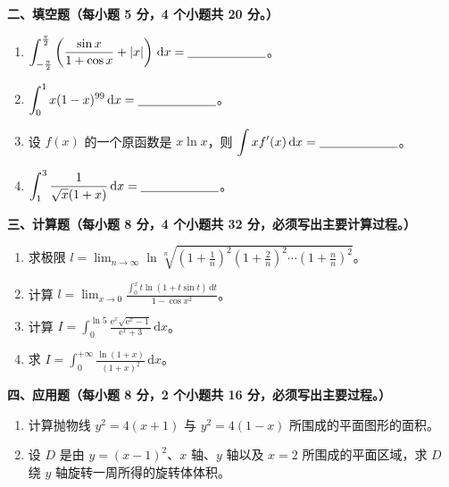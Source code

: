 \documentclass[a4paper,11pt]{ctexart}
\newcommand{\dd}{\,\mathrm{d}}
\newcommand{\e}{\mathrm{e}}
\newcommand{\blank}[1][2.2cm]{\underline{\hspace{#1}}}
\begin{document}
\vspace{0.5em}

\textbf{二、填空题（每小题 5 分，4 个小题共 20 分。）}

\begin{enumerate}[label=\arabic*., start=5, leftmargin=2em, itemsep=0.45em, topsep=0.35em]
  \item $\displaystyle\int_{-\frac{\pi}{2}}^{\frac{\pi}{2}}\left(\frac{\sin x}{1+\cos x}+|x|\right)\dd x=\blank$。

  \item $\displaystyle\int_0^1 x(1-x)^{99}\dd x=\blank$。

  \item 设 $f(x)$ 的一个原函数是 $x\ln x$，则 $\displaystyle\int xf'(x)\dd x=\blank$。

  \item $\displaystyle\int_1^3 \frac{1}{\sqrt{x}(1+x)}\dd x=\blank$。
\end{enumerate}

\newpage

\textbf{三、计算题（每小题 8 分，4 个小题共 32 分，必须写出主要计算过程。）}

\begin{enumerate}[label=\arabic*., start=9, leftmargin=2em, itemsep=1.1em, topsep=0.6em]
  \item 求极限 $l=\displaystyle\lim_{n\to\infty}\ln\sqrt[n]{\left(1+\frac{1}{n}\right)^2\left(1+\frac{2}{n}\right)^2\cdots\left(1+\frac{n}{n}\right)^2}$。

  \item 计算 $l=\displaystyle\lim_{x\to 0}\frac{\displaystyle\int_0^x t\ln(1+t\sin t)\dd t}{1-\cos x^2}$。

  \item 计算 $I=\displaystyle\int_0^{\ln 5}\frac{\e^x\sqrt{\e^x-1}}{\e^x+3}\dd x$。

  \item 求 $I=\displaystyle\int_0^{+\infty}\frac{\ln(1+x)}{(1+x)^2}\dd x$。
\end{enumerate}

\vspace{1.0em}

\textbf{四、应用题（每小题 8 分，2 个小题共 16 分，必须写出主要过程。）}

\begin{enumerate}[label=\arabic*., start=13, leftmargin=2em, itemsep=1.0em, topsep=0.6em]
  \item 计算抛物线 $y^2=4(x+1)$ 与 $y^2=4(1-x)$ 所围成的平面图形的面积。

  \item 设 $D$ 是由 $y=(x-1)^2$、$x$ 轴、$y$ 轴以及 $x=2$ 所围成的平面区域，求 $D$ 绕 $y$ 轴旋转一周所得的旋转体体积。
\end{enumerate}
\end{document}
